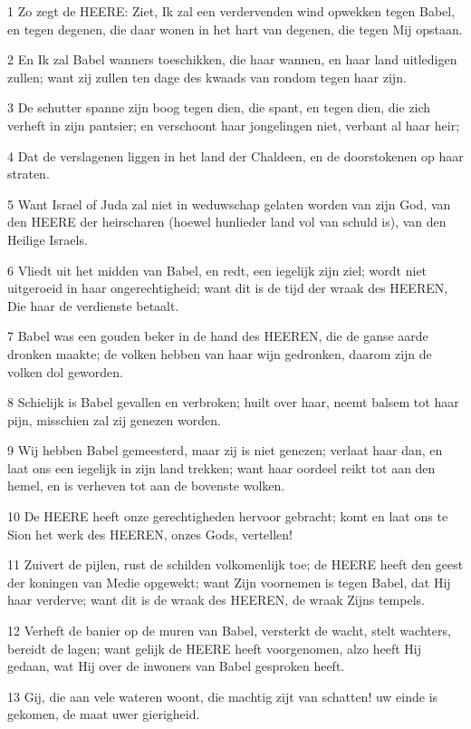 \par 1 Zo zegt de HEERE: Ziet, Ik zal een verdervenden wind opwekken tegen Babel, en tegen degenen, die daar wonen in het hart van degenen, die tegen Mij opstaan.
\par 2 En Ik zal Babel wanners toeschikken, die haar wannen, en haar land uitledigen zullen; want zij zullen ten dage des kwaads van rondom tegen haar zijn.
\par 3 De schutter spanne zijn boog tegen dien, die spant, en tegen dien, die zich verheft in zijn pantsier; en verschoont haar jongelingen niet, verbant al haar heir;
\par 4 Dat de verslagenen liggen in het land der Chaldeen, en de doorstokenen op haar straten.
\par 5 Want Israel of Juda zal niet in weduwschap gelaten worden van zijn God, van den HEERE der heirscharen (hoewel hunlieder land vol van schuld is), van den Heilige Israels.
\par 6 Vliedt uit het midden van Babel, en redt, een iegelijk zijn ziel; wordt niet uitgeroeid in haar ongerechtigheid; want dit is de tijd der wraak des HEEREN, Die haar de verdienste betaalt.
\par 7 Babel was een gouden beker in de hand des HEEREN, die de ganse aarde dronken maakte; de volken hebben van haar wijn gedronken, daarom zijn de volken dol geworden.
\par 8 Schielijk is Babel gevallen en verbroken; huilt over haar, neemt balsem tot haar pijn, misschien zal zij genezen worden.
\par 9 Wij hebben Babel gemeesterd, maar zij is niet genezen; verlaat haar dan, en laat ons een iegelijk in zijn land trekken; want haar oordeel reikt tot aan den hemel, en is verheven tot aan de bovenste wolken.
\par 10 De HEERE heeft onze gerechtigheden hervoor gebracht; komt en laat ons te Sion het werk des HEEREN, onzes Gods, vertellen!
\par 11 Zuivert de pijlen, rust de schilden volkomenlijk toe; de HEERE heeft den geest der koningen van Medie opgewekt; want Zijn voornemen is tegen Babel, dat Hij haar verderve; want dit is de wraak des HEEREN, de wraak Zijns tempels.
\par 12 Verheft de banier op de muren van Babel, versterkt de wacht, stelt wachters, bereidt de lagen; want gelijk de HEERE heeft voorgenomen, alzo heeft Hij gedaan, wat Hij over de inwoners van Babel gesproken heeft.
\par 13 Gij, die aan vele wateren woont, die machtig zijt van schatten! uw einde is gekomen, de maat uwer gierigheid.
